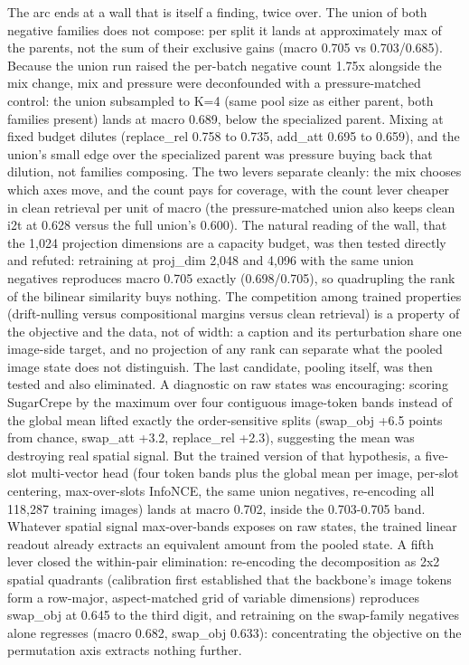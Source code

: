 \documentclass[
  11pt,
]{article}
\begin{document}
The arc ends at a wall that is itself a finding, twice over. The union
of both negative families does not compose: per split it lands at
approximately max of the parents, not the sum of their exclusive gains
(macro 0.705 vs 0.703/0.685). Because the union run raised the per-batch
negative count 1.75x alongside the mix change, mix and pressure were
deconfounded with a pressure-matched control: the union subsampled to
K=4 (same pool size as either parent, both families present) lands at
macro 0.689, below the specialized parent. Mixing at fixed budget
dilutes (replace\_rel 0.758 to 0.735, add\_att 0.695 to 0.659), and the
union's small edge over the specialized parent was pressure buying back
that dilution, not families composing. The two levers separate cleanly:
the mix chooses which axes move, and the count pays for coverage, with
the count lever cheaper in clean retrieval per unit of macro (the
pressure-matched union also keeps clean i2t at 0.628 versus the full
union's 0.600). The natural reading of the wall, that the 1,024
projection dimensions are a capacity budget, was then tested directly
and refuted: retraining at proj\_dim 2,048 and 4,096 with the same union
negatives reproduces macro 0.705 exactly (0.698/0.705), so quadrupling
the rank of the bilinear similarity buys nothing. The competition among
trained properties (drift-nulling versus compositional margins versus
clean retrieval) is a property of the objective and the data, not of
width: a caption and its perturbation share one image-side target, and
no projection of any rank can separate what the pooled image state does
not distinguish. The last candidate, pooling itself, was then tested and
also eliminated. A diagnostic on raw states was encouraging: scoring
SugarCrepe by the maximum over four contiguous image-token bands instead
of the global mean lifted exactly the order-sensitive splits (swap\_obj
+6.5 points from chance, swap\_att +3.2, replace\_rel +2.3), suggesting
the mean was destroying real spatial signal. But the trained version of
that hypothesis, a five-slot multi-vector head (four token bands plus
the global mean per image, per-slot centering, max-over-slots InfoNCE,
the same union negatives, re-encoding all 118,287 training images) lands
at macro 0.702, inside the 0.703-0.705 band. Whatever spatial signal
max-over-bands exposes on raw states, the trained linear readout already
extracts an equivalent amount from the pooled state. A fifth lever
closed the within-pair elimination: re-encoding the decomposition as 2x2
spatial quadrants (calibration first established that the backbone's
image tokens form a row-major, aspect-matched grid of variable
dimensions) reproduces swap\_obj at 0.645 to the third digit, and
retraining on the swap-family negatives alone regresses (macro 0.682,
swap\_obj 0.633): concentrating the objective on the permutation axis
extracts nothing further.
\end{document}
